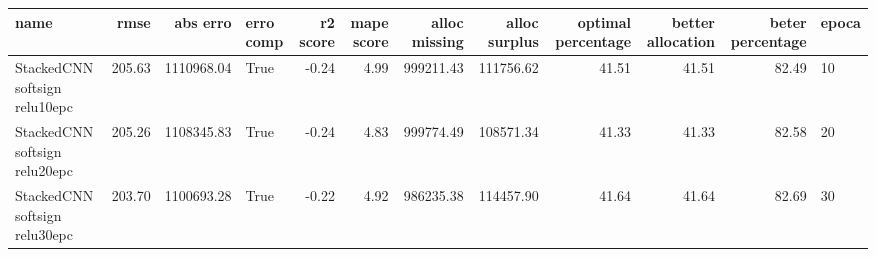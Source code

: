 \begin{tabular}{lrrlrrrrrrrl}
\toprule
name & rmse & abs erro & erro comp & r2 score & mape score & alloc missing & alloc surplus & optimal percentage & better allocation & beter percentage & epoca \\
\midrule
StackedCNN softsign relu10epc & 205.63 & 1110968.04 & True & -0.24 & 4.99 & 999211.43 & 111756.62 & 41.51 & 41.51 & 82.49 & 10 \\
StackedCNN softsign relu20epc & 205.26 & 1108345.83 & True & -0.24 & 4.83 & 999774.49 & 108571.34 & 41.33 & 41.33 & 82.58 & 20 \\
StackedCNN softsign relu30epc & 203.70 & 1100693.28 & True & -0.22 & 4.92 & 986235.38 & 114457.90 & 41.64 & 41.64 & 82.69 & 30 \\
\bottomrule
\end{tabular}
